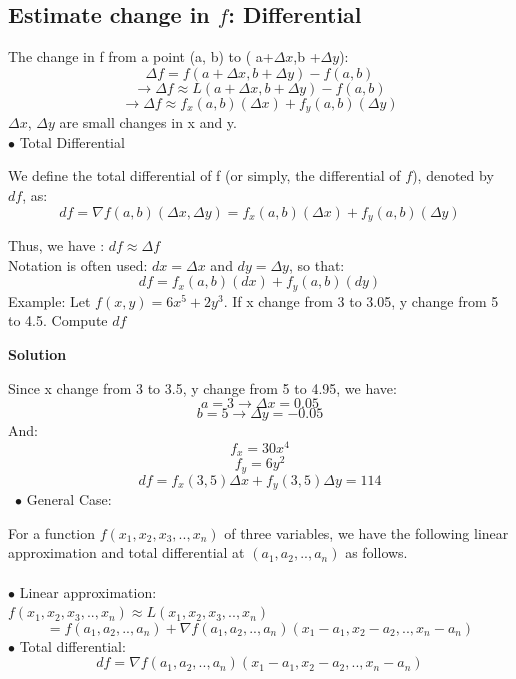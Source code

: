 \documentclass[12pt]{article}
\begin{document}
\subsection{Estimate change in $f$: Differential }
 The change in f from a point (a, b) to ( a+$\Delta x$,b +$\Delta y$):
 $$\Delta f = f(a+\Delta x,b +\Delta y) - f(a,b)$$
 $$ \rightarrow \Delta f \approx L(a+\Delta x,b +\Delta y) - f(a,b)$$
  $$ \rightarrow \Delta f \approx f_x(a,b)(\Delta x)+f_y(a,b)(\Delta y) $$
 $\Delta x$, $\Delta y$ are small changes in x and y.\\
 $\bullet$ Total Differential
\begin{mybox}
    We define the total differential of f (or simply, the differential of $f$), denoted by $df$, as:
    $$df = \nabla f(a,b) (\Delta x,\Delta y) = f_x(a,b)(\Delta x)+f_y(a,b)(\Delta y) $$
\end{mybox}
Thus, we have : $df \approx \Delta f $\\
Notation is often used: $dx = \Delta x$ and $dy = \Delta y$, so that:\\
$$ df =  f_x(a,b)( dx)+f_y(a,b)(dy)$$
Example: Let $f(x,y) = 6x^5 + 2y^3 $. If x change from 3 to 3.05, y change from 5 to 4.5. Compute $df$
 \begin{center}
     \textbf{Solution} 
 \end{center}
Since x change from 3 to 3.5, y change from 5 to 4.95, we have: 
$$a = 3 \rightarrow \Delta x = 0.05$$
$$b = 5 \rightarrow \Delta y = -0.05$$
And: 
$$f_x = 30x^4 $$
$$f_y = 6y^2$$
$$df = f_x(3,5)\Delta x +f_y(3,5) \Delta y = 114$$
\
$\bullet$ General Case:
\begin{mybox}
    For a function $f(x_1, x_2, x_3,..,x_n)$ of three variables, we have the following linear approximation and total differential at $(a_1, a_2,.., a_n)$ as follows.\\
    \\
    $\bullet$ Linear approximation: \\
    $f(x_1, x_2, x_3,..,x_n) \approx L(x_1, x_2, x_3,..,x_n)$
    $$                        = f(a_1, a_2,.., a_n)+ \nabla  f(a_1, a_2,.., a_n)(x_1-a_1,x_2-a_2,..,x_n -a_n)  $$
    $\bullet$ Total differential:
    $$df = \nabla  f(a_1, a_2,.., a_n)(x_1-a_1,x_2-a_2,..,x_n -a_n) $$
\end{mybox}
    \newpage
\end{document}
